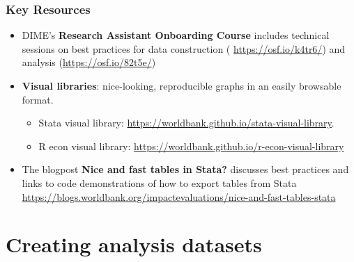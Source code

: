 \documentclass[
]{book}
\providecommand{\tightlist}{%
  \setlength{\itemsep}{0pt}\setlength{\parskip}{0pt}}
\begin{document}
\begin{summary}
\hypertarget{key-resources-5}{%
\subsubsection*{Key Resources}\label{key-resources-5}}

\begin{itemize}
\tightlist
\item
  DIME's \textbf{Research Assistant Onboarding Course} includes technical sessions on best practices for data construction ( \url{https://osf.io/k4tr6/}) and analysis (\url{https://osf.io/82t5e/})
\item
  \textbf{Visual libraries}: nice-looking, reproducible graphs in an easily browsable format.

  \begin{itemize}
  \tightlist
  \item
    Stata visual library: \url{https://worldbank.github.io/stata-visual-library}.
  \item
    R econ visual library: \url{https://worldbank.github.io/r-econ-visual-library}
  \end{itemize}
\item
  The blogpost \textbf{Nice and fast tables in Stata?} discusses best practices and links to code demonstrations of how to export tables from Stata \url{https://blogs.worldbank.org/impactevaluations/nice-and-fast-tables-stata}
\end{itemize}
\end{summary}

\hypertarget{creating-analysis-datasets}{%
\section*{Creating analysis datasets}\label{creating-analysis-datasets}}
\end{document}
